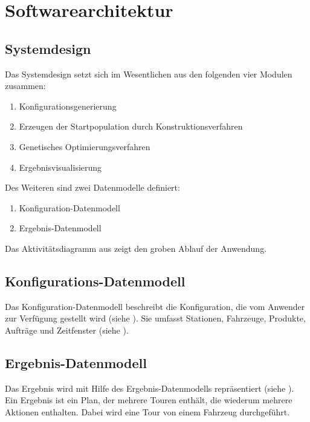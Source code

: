 \section{Softwarearchitektur}

\subsection{Systemdesign}
Das Systemdesign setzt sich im Wesentlichen aus den folgenden vier Modulen zusammen:
\begin{enumerate}
 \item Konfigurationsgenerierung
 \item Erzeugen der Startpopulation durch Konstruktionsverfahren
 \item Genetisches Optimierungsverfahren
 \item Ergebnisvisualisierung
\end{enumerate}
Des Weiteren sind zwei Datenmodelle definiert:
\begin{enumerate}
 \item Konfiguration-Datenmodell
 \item Ergebnis-Datenmodell
\end{enumerate}
Das Aktivitätsdiagramm aus  zeigt den groben Ablauf der Anwendung.


\subsection{Konfigurations-Datenmodell}
Das Konfiguration-Datenmodell beschreibt die Konfiguration, die vom Anwender zur Verfügung gestellt wird (siehe ). Sie umfasst Stationen, Fahrzeuge, Produkte, Aufträge und Zeitfenster (siehe ).

\subsection{Ergebnis-Datenmodell}
Das Ergebnis wird mit Hilfe des Ergebnis-Datenmodells repräsentiert (siehe ). Ein Ergebnis ist ein Plan, der mehrere Touren enthält, die wiederum mehrere Aktionen enthalten. Dabei wird eine Tour von einem Fahrzeug durchgeführt.

